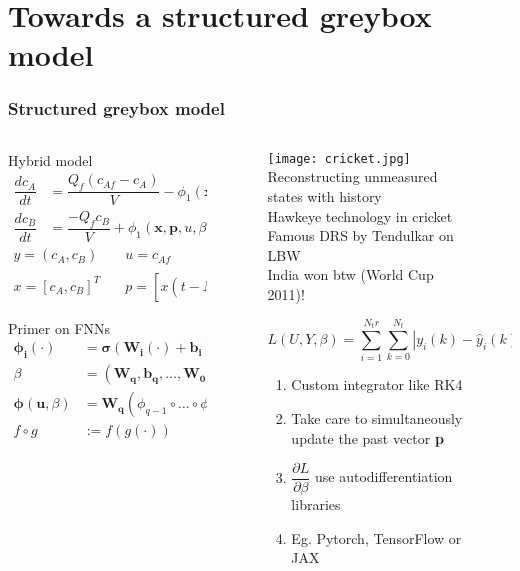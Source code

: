 \documentclass[dvipsnames, 9pt]{beamer}
\begin{document}
\section{Towards a structured greybox model}
\begin{frame}
    \frametitle{Structured greybox model}
    
    \begin{columns}
    {   \begin{column}{0.57\textwidth}
        \begin{block}{Hybrid model}
\begin{align*}
\dfrac{dc_A}{dt} &= \dfrac{Q_f (c_{Af} - c_A)}{V} - \phi_1 (\mathbf{x, p}, u,\beta) \\
\dfrac{dc_B}{dt} &= \dfrac{-Q_f c_B}{V} + \phi_1 (\mathbf{x, p}, u,\beta) - 3 \phi_2 (\mathbf{x, p}, u,\beta) 
\end{align*}
\begin{align*}
y = (c_A, c_B) &\quad u = c_{Af} \\
x = [c_A, c_B]^T &\quad p = [x(t - N_p \Delta)^T, \ldots , x(t - \Delta)^T]^T 
\end{align*}
\end{block}
\begin{block}{Primer on FNNs}
\begin{align*}
\boldsymbol{\phi_i}(\cdot) &= \boldsymbol{\sigma}(\mathbf{W_i}(\cdot) + \mathbf{b_i}) \\
\beta &= (\mathbf{W_q, b_q, \ldots, W_0, b_0}) \\
\boldsymbol{\phi}(\mathbf{u}, \beta) &= \mathbf{W_q} (\phi_{q-1} \circ \ldots \circ \phi_0(\mathbf{u})) + \mathbf{b_q} \\
f \circ g &:= f(g(\cdot))
\end{align*}
\end{block}
        \end{column}}
        \begin{column}{0.4\textwidth}
            \begin{figure}
\texttt{[image: cricket.jpg]}
\scriptsize{Reconstructing unmeasured states with history \\ Hawkeye technology in cricket \\ Famous DRS by Tendulkar on LBW \\ India won btw (World Cup 2011)!}
\newline
\begin{alertblock}{}
\begin{equation*}
L(U,Y,\beta) = \sum_{i=1}^{N_tr} \sum_{k=0}^{N_t} |y_i(k) - \hat{y}_i (k)|^2
\end{equation*}
\begin{enumerate}
\scriptsize
\item Custom integrator like RK4
\item Take care to simultaneously update the past vector \textbf{p}
\item $\dfrac{\partial L}{\partial \beta}$ use autodifferentiation libraries
\item Eg. Pytorch, TensorFlow or JAX
\end{enumerate}
\end{alertblock}


\end{figure}
\end{column}
\end{columns}
\end{frame}
\end{document}
